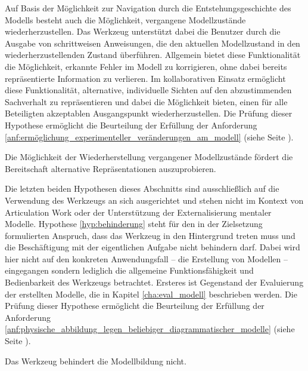 Auf Basis der Möglichkeit zur Navigation durch die Entstehungsgeschichte des Modells besteht auch die Möglichkeit, vergangene Modellzustände wiederherzustellen. Das Werkzeug unterstützt dabei die Benutzer durch die Ausgabe von schrittweisen Anweisungen, die den aktuellen Modellzustand in den wiederherzustellenden Zustand überführen. Allgemein bietet diese Funktionalität die Möglichkeit, erkannte Fehler im Modell zu korrigieren, ohne dabei bereits repräsentierte Information zu verlieren. Im kollaborativen Einsatz ermöglicht diese Funktionalität, alternative, individuelle Sichten auf den abzustimmenden Sachverhalt zu repräsentieren und dabei die Möglichkeit bieten, einen für alle Beteiligten akzeptablen Ausgangspunkt wiederherzustellen. Die Prüfung dieser Hypothese ermöglicht die Beurteilung der Erfüllung der Anforderung \ref{anf:ermöglichung_experimenteller_veränderungen_am_modell} (siehe Seite \pageref{anf:ermöglichung_experimenteller_veränderungen_am_modell}).

\begin{hyp}
	\label{hyp:wiederherstellung}
	Die Möglichkeit der Wiederherstellung vergangener Modellzustände fördert die Bereitschaft alternative Repräsentationen auszuprobieren.
\end{hyp}

Die letzten beiden Hypothesen dieses Abschnitts sind ausschließlich auf die Verwendung des Werkzeugs an sich ausgerichtet und stehen nicht im Kontext von Articulation Work oder der Unterstützung der Externalisierung mentaler Modelle. Hypothese \ref{hyp:behinderung} steht für den in der Zielsetzung formulierten Anspruch, dass das Werkzeug in den Hintergrund treten muss und die Beschäftigung mit der eigentlichen Aufgabe nicht behindern darf. Dabei wird hier nicht auf den konkreten Anwendungsfall -- die Erstellung von Modellen -- eingegangen sondern lediglich die allgemeine Funktionsfähigkeit und Bedienbarkeit des Werkzeugs betrachtet. Ersteres ist Gegenstand der Evaluierung der erstellten Modelle, die in Kapitel \ref{cha:eval_modell} beschrieben werden. Die Prüfung dieser Hypothese ermöglicht die Beurteilung der Erfüllung der Anforderung \ref{anf:physische_abbildung_legen_beliebiger_diagrammatischer_modelle} (siehe Seite \pageref{anf:physische_abbildung_legen_beliebiger_diagrammatischer_modelle}).

\begin{hyp}
	\label{hyp:behinderung}
	Das Werkzeug behindert die Modellbildung nicht.
\end{hyp}

